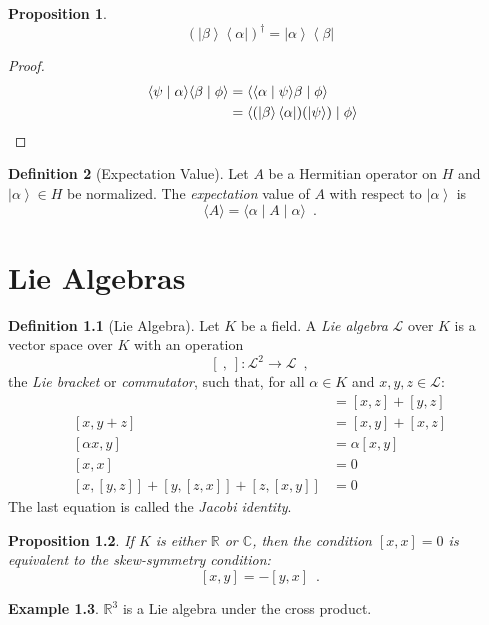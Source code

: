 \documentclass{book}
\let\qed\relax
\newtheorem{prop}{Proposition}[chapter]
\theoremstyle{definition}
\newtheorem{df}[prop]{Definition}
\newtheorem{ex}[prop]{Example}
\newcommand{\bra}[1]{\ensuremath{\left\langle {#1} \right|}}
\newcommand{\ket}[1]{\ensuremath{\left| {#1} \right\rangle}}
\begin{document}
\begin{prop}
\[ (\ket{\beta} \bra{\alpha})^\dagger = \ket{\alpha} \bra{\beta} \]
\end{prop}

\begin{proof}
\pf
\begin{align*}
\langle \psi \mid \alpha \rangle \langle \beta \mid \phi \rangle
& = \langle \langle \alpha \mid \psi \rangle \beta \mid \phi \rangle \\
& = \langle (\ket{\beta} \bra{\alpha})(\ket{\psi}) \mid \phi \rangle & \qed
\end{align*}
\end{proof}

\begin{df}[Expectation Value]
Let $A$ be a Hermitian operator on $H$ and $\ket{\alpha} \in H$ be normalized. The \emph{expectation} value of $A$ with respect to $\ket{\alpha}$ is
\[ \langle A \rangle = \langle \alpha \mid A \mid \alpha \rangle \enspace . \]
\end{df}

\chapter{Lie Algebras}

\begin{df}[Lie Algebra]
Let $K$ be a field. A \emph{Lie algebra} $\mathcal{L}$ over $K$ is a vector space over $K$ with an operation
\[ [\ ,\ ] : \mathcal{L}^2 \rightarrow \mathcal{L} \enspace , \]
the \emph{Lie bracket} or \emph{commutator}, such that, for all $\alpha \in K$ and $x,y,z \in \mathcal{L}$:
\begin{align*}
[x+y,z] & = [x,z] + [y,z] \\
[x,y+z] & = [x,y] + [x,z] \\
[\alpha x,y] & = \alpha [x,y] \\
[x,x] & = 0 \\
[x,[y,z]] + [y,[z,x]] + [z,[x,y]] & = 0
\end{align*}
The last equation is called the \emph{Jacobi identity}.
\end{df}

\begin{prop}
If $K$ is either $\mathbb{R}$ or $\mathbb{C}$, then the condition $[x,x] = 0$ is equivalent to the \emph{skew-symmetry condition}:
\[ [x,y] = -[y,x] \enspace . \]
\end{prop}


\begin{ex}
$\mathbb{R}^3$ is a Lie algebra under the cross product.
\end{ex}
\end{document}
